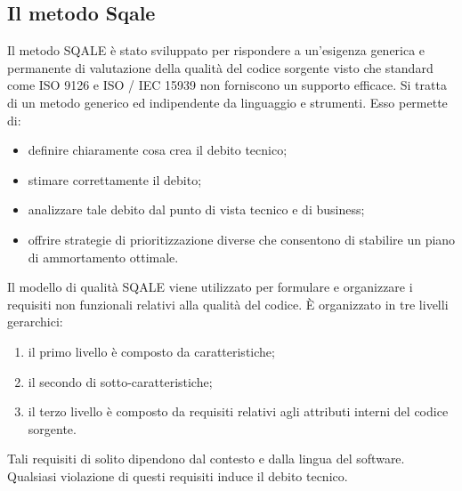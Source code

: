 \subsection{Il metodo Sqale}
Il metodo SQALE è stato sviluppato per rispondere a un'esigenza generica e permanente di valutazione della qualità del codice sorgente visto che standard come ISO 9126 e ISO / IEC 15939 non forniscono un supporto efficace. Si tratta di un metodo generico ed indipendente da linguaggio e strumenti. Esso permette di:
\begin{itemize}
\item definire chiaramente cosa crea il debito tecnico;
\item stimare correttamente il debito;
\item analizzare tale debito dal punto di vista tecnico e di business;
\item offrire strategie di prioritizzazione diverse che consentono di stabilire un piano di ammortamento ottimale. 
\end{itemize}
Il modello di qualità SQALE viene utilizzato per formulare e organizzare i requisiti non funzionali relativi alla qualità del codice. È organizzato in tre livelli gerarchici:
\begin{enumerate}
\item il primo livello è composto da caratteristiche;
\item il secondo di sotto-caratteristiche;
\item il terzo livello è composto da requisiti relativi agli attributi interni del codice sorgente.
\end{enumerate}
Tali requisiti di solito dipendono dal contesto e dalla lingua del software. Qualsiasi violazione di questi requisiti induce il debito tecnico.